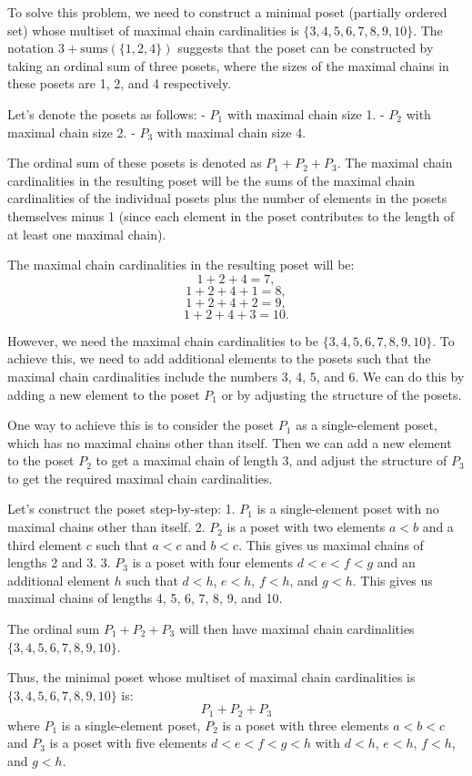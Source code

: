 To solve this problem, we need to construct a minimal poset (partially ordered set) whose multiset of maximal chain cardinalities is \(\{3, 4, 5, 6, 7, 8, 9, 10\}\). The notation \(3 + \text{sums}(\{1, 2, 4\})\) suggests that the poset can be constructed by taking an ordinal sum of three posets, where the sizes of the maximal chains in these posets are 1, 2, and 4 respectively.

Let's denote the posets as follows:
- \(P_1\) with maximal chain size 1.
- \(P_2\) with maximal chain size 2.
- \(P_3\) with maximal chain size 4.

The ordinal sum of these posets is denoted as \(P_1 + P_2 + P_3\). The maximal chain cardinalities in the resulting poset will be the sums of the maximal chain cardinalities of the individual posets plus the number of elements in the posets themselves minus 1 (since each element in the poset contributes to the length of at least one maximal chain).

The maximal chain cardinalities in the resulting poset will be:
\[1 + 2 + 4 = 7,\]
\[1 + 2 + 4 + 1 = 8,\]
\[1 + 2 + 4 + 2 = 9,\]
\[1 + 2 + 4 + 3 = 10.\]

However, we need the maximal chain cardinalities to be \(\{3, 4, 5, 6, 7, 8, 9, 10\}\). To achieve this, we need to add additional elements to the posets such that the maximal chain cardinalities include the numbers 3, 4, 5, and 6. We can do this by adding a new element to the poset \(P_1\) or by adjusting the structure of the posets.

One way to achieve this is to consider the poset \(P_1\) as a single-element poset, which has no maximal chains other than itself. Then we can add a new element to the poset \(P_2\) to get a maximal chain of length 3, and adjust the structure of \(P_3\) to get the required maximal chain cardinalities.

Let's construct the poset step-by-step:
1. \(P_1\) is a single-element poset with no maximal chains other than itself.
2. \(P_2\) is a poset with two elements \(a < b\) and a third element \(c\) such that \(a < c\) and \(b < c\). This gives us maximal chains of lengths 2 and 3.
3. \(P_3\) is a poset with four elements \(d < e < f < g\) and an additional element \(h\) such that \(d < h\), \(e < h\), \(f < h\), and \(g < h\). This gives us maximal chains of lengths 4, 5, 6, 7, 8, 9, and 10.

The ordinal sum \(P_1 + P_2 + P_3\) will then have maximal chain cardinalities \(\{3, 4, 5, 6, 7, 8, 9, 10\}\).

Thus, the minimal poset whose multiset of maximal chain cardinalities is \(\{3, 4, 5, 6, 7, 8, 9, 10\}\) is:
\[
\boxed{P_1 + P_2 + P_3}
\]
where \(P_1\) is a single-element poset, \(P_2\) is a poset with three elements \(a < b < c\) and \(P_3\) is a poset with five elements \(d < e < f < g < h\) with \(d < h\), \(e < h\), \(f < h\), and \(g < h\).